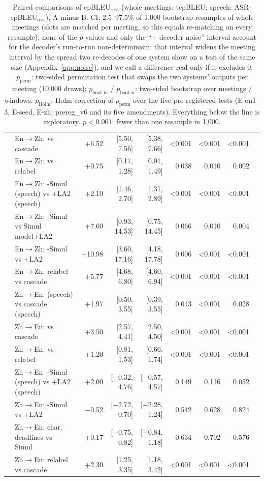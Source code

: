 \begin{table}[t]
{\begin{tabular}{llrrrrrrr}
 & En$\rightarrow$Zh: \sys{} vs cascade & +6.52 & [5.50, 7.56] & [5.38, 7.66] & {<}0.001 & {<}0.001 & {<}0.001 &  \\
 & En$\rightarrow$Zh: \sys{} vs relabel & +0.75 & [0.17, 1.28] & [0.01, 1.49] & 0.038 & 0.010 & 0.002 &  \\
 & En$\rightarrow$Zh: \sys{}-Simul (speech) vs \sys{}+LA2 (speech) & +2.10 & [1.46, 2.70] & [1.31, 2.89] & {<}0.001 & {<}0.001 & {<}0.001 &  \\
 & En$\rightarrow$Zh: \sys{}-Simul vs Simul model+LA2 & +7.60 & [0.93, 14.53] & [0.75, 14.45] & 0.066 & 0.010 & 0.004 &  \\
 & En$\rightarrow$Zh: \sys{}-Simul vs \sys{}+LA2 & +10.98 & [3.60, 17.16] & [4.18, 17.78] & 0.006 & {<}0.001 & {<}0.001 &  \\
 & En$\rightarrow$Zh: relabel vs cascade & +5.77 & [4.68, 6.80] & [4.60, 6.94] & {<}0.001 & {<}0.001 & {<}0.001 &  \\
 & Zh$\rightarrow$En: \sys{} (speech) vs cascade (speech) & +1.97 & [0.50, 3.55] & [0.39, 3.55] & 0.013 & {<}0.001 & 0.028 &  \\
 & Zh$\rightarrow$En: \sys{} vs cascade & +3.50 & [2.57, 4.41] & [2.50, 4.50] & {<}0.001 & {<}0.001 & {<}0.001 &  \\
 & Zh$\rightarrow$En: \sys{} vs relabel & +1.20 & [0.81, 1.53] & [0.66, 1.74] & {<}0.001 & {<}0.001 & {<}0.001 &  \\
 & Zh$\rightarrow$En: \sys{}-Simul (speech) vs \sys{}+LA2 (speech) & +2.00 & [$-$0.32, 4.76] & [$-$0.57, 4.57] & 0.149 & 0.116 & 0.052 &  \\
 & Zh$\rightarrow$En: \sys{}-Simul vs \sys{}+LA2 & $-$0.52 & [$-$2.72, 0.70] & [$-$2.28, 1.24] & 0.542 & 0.628 & 0.824 &  \\
 & Zh$\rightarrow$En: char. deadlines vs \sys{}-Simul & +0.17 & [$-$0.75, 0.82] & [$-$0.84, 1.18] & 0.634 & 0.702 & 0.576 &  \\
 & Zh$\rightarrow$En: relabel vs cascade & +2.30 & [1.25, 3.35] & [1.18, 3.42] & {<}0.001 & {<}0.001 & {<}0.001 &  \\
\bottomrule
\end{tabular}}
\caption{Paired comparisons of cpBLEU$_\text{sess}$ (whole meetings: tcpBLEU; speech: ASR-cpBLEU$_\text{sess}$), A minus B. CI: 2.5--97.5\% of 1{,}000 bootstrap resamples of whole meetings (slots are matched per meeting, so this equals re-matching on every resample); none of the $p$ values and only the ``+ decoder noise'' interval account for the decoder's run-to-run non-determinism: that interval widens the meeting interval by the spread two re-decodes of one system show on a test of the same size (Appendix~\ref{app:noise}), and we call a difference real only if it excludes 0. $p_\text{perm}$: two-sided permutation test that swaps the two systems' outputs per meeting (10{,}000 draws); $p_\text{boot,m}$ / $p_\text{boot,w}$: two-sided bootstrap over meetings / windows. $p_\text{Holm}$: Holm correction of $p_\text{perm}$ over the five pre-registered tests (E-on1--3, E-seed, E-zh; prereg\_v6 and its five amendments). Everything below the line is exploratory. $p<0.001$: fewer than one resample in 1{,}000.}
\label{tab:sig6}
\end{table}
